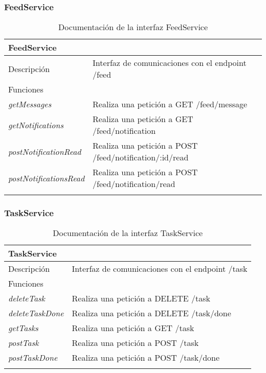 \subsubsection{FeedService}

\begin{longtable}{|p{} p{}|}
    \hline
    \multicolumn{2}{|l|}{FeedService} \\ \hline \hline
    Descripción      & Interfaz de comunicaciones con el endpoint /feed \\ \hline
    \multicolumn{2}{|l|}{Funciones} \\
    \emph{getMessages}  & Realiza una petición a GET /feed/message \\
    \emph{getNotifications}  & Realiza una petición a GET /feed/notification \\
    \emph{postNotificationRead}  & Realiza una petición a POST /feed/notification/:id/read \\
    \emph{postNotificationsRead}  & Realiza una petición a POST /feed/notification/read \\  \hline
    \caption{Documentación de la interfaz FeedService}
    \label{dis:app:feed_service}
\end{longtable}

\subsubsection{TaskService}

\begin{longtable}{|p{} p{}|}
    \hline
    \multicolumn{2}{|l|}{TaskService} \\ \hline \hline
    Descripción      & Interfaz de comunicaciones con el endpoint /task \\ \hline
    \multicolumn{2}{|l|}{Funciones} \\
    \emph{deleteTask}  & Realiza una petición a DELETE /task \\
    \emph{deleteTaskDone}  & Realiza una petición a DELETE /task/done \\
    \emph{getTasks}  & Realiza una petición a GET /task \\
    \emph{postTask}  & Realiza una petición a POST /task \\
    \emph{postTaskDone}  & Realiza una petición a POST /task/done \\  \hline
    \caption{Documentación de la interfaz TaskService}
    \label{dis:app:task_service}
\end{longtable}

